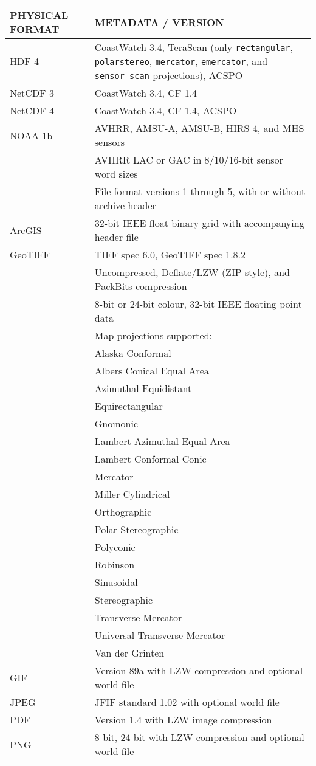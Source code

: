 \begin{tabular}{|l|p{10cm}|}
  \hline 

  PHYSICAL FORMAT & METADATA / VERSION \\ \hline

  HDF 4 & CoastWatch 3.4, TeraScan (only {\tt rectangular}, {\tt polarstereo},
  {\tt mercator}, {\tt emercator}, and {\tt sensor\ scan} projections), ACSPO \\ \hline

  NetCDF 3 & CoastWatch 3.4, CF 1.4 \\ \hline

  NetCDF 4 & CoastWatch 3.4, CF 1.4, ACSPO \\ \hline

  NOAA 1b & AVHRR, AMSU-A, AMSU-B, HIRS 4, and MHS sensors \\
  & AVHRR LAC or GAC in 8/10/16-bit sensor word sizes \\
  & File format versions 1 through 5, with or without archive header \\ \hline

  ArcGIS & 32-bit IEEE float binary grid with accompanying header
  file \\ \hline

  GeoTIFF & TIFF spec 6.0, GeoTIFF spec 1.8.2 \\
  & Uncompressed, Deflate/LZW (ZIP-style), and PackBits compression \\
  & 8-bit or 24-bit colour, 32-bit IEEE floating point data \\
  & Map projections supported: \\
  & Alaska Conformal \\
  & Albers Conical Equal Area \\
  & Azimuthal Equidistant \\
  & Equirectangular \\
  & Gnomonic \\
  & Lambert Azimuthal Equal Area \\
  & Lambert Conformal Conic \\
  & Mercator \\
  & Miller Cylindrical \\
  & Orthographic \\
  & Polar Stereographic \\
  & Polyconic \\
  & Robinson \\
  & Sinusoidal \\
  & Stereographic \\
  & Transverse Mercator \\
  & Universal Transverse Mercator \\
  & Van der Grinten \\ \hline

  GIF & Version 89a with LZW compression and optional world file \\ \hline

  JPEG & JFIF standard 1.02 with optional world file \\ \hline

  PDF & Version 1.4 with LZW image compression \\ \hline

  PNG & 8-bit, 24-bit with LZW compression and optional world file \\ \hline

\end{tabular}
